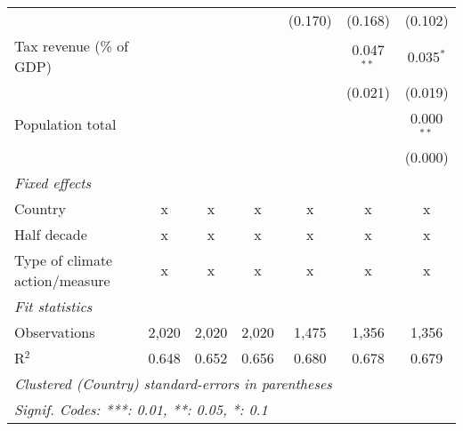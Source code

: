 \begin{tabular}{lcccccc}
                                                    &         &                &                & (0.170)        & (0.168)        & (0.102)\\   
   Tax revenue (\% of GDP)                          &         &                &                &                & 0.047$^{**}$   & 0.035$^{*}$\\   
                                                    &         &                &                &                & (0.021)        & (0.019)\\   
   Population total                                 &         &                &                &                &                & 0.000$^{**}$\\   
                                                    &         &                &                &                &                & (0.000)\\   
   \emph{Fixed effects}\\
   Country                                          & x       & x              & x              & x              & x              & x\\  
   Half decade                                      & x       & x              & x              & x              & x              & x\\  
   Type of climate action/measure                   & x       & x              & x              & x              & x              & x\\  
   \midrule \emph{Fit statistics}\\
   Observations                                     & 2,020   & 2,020          & 2,020          & 1,475          & 1,356          & 1,356\\  
   R$^2$                                            & 0.648   & 0.652          & 0.656          & 0.680          & 0.678          & 0.679\\  
   \midrule
   \multicolumn{7}{l}{\emph{Clustered (Country) standard-errors in parentheses}}\\
   \multicolumn{7}{l}{\emph{Signif. Codes: ***: 0.01, **: 0.05, *: 0.1}}\\
\end{tabular}
\par\endgroup


